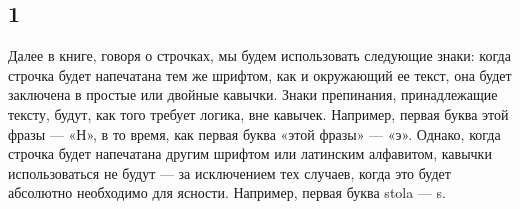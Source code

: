 \subsection{1}

Далее в книге, говоря о строчках, мы будем использовать следующие знаки: когда строчка будет напечатана тем же шрифтом, как и окружающий ее текст, она будет заключена в простые или двойные кавычки. Знаки препинания, принадлежащие тексту, будут, как того требует логика, вне кавычек. Например, первая буква этой фразы --- «Н», в то время, как первая буква «этой фразы» --- «э». Однако, когда строчка будет напечатана другим шрифтом или латинским алфавитом, кавычки использоваться не будут --- за исключением тех случаев, когда это будет абсолютно необходимо для ясности. Например, первая буква stola --- s.

